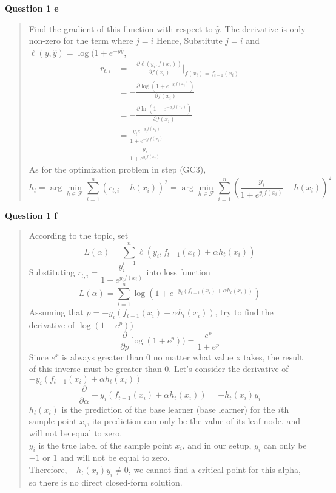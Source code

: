\documentclass[12pt,a4paper]{article}
\begin{document}
    \newpage
    \textbf{Question 1 e}
    \vspace{2mm}
    \begin{quote}
        Find the gradient of this function with respect to $\hat{y}$.
        The derivative is only non-zero for the term where $j = i$
        Hence, Substitute $j=i$ and $\ell(y,\hat{y})=\log(1+e^{-y\hat{y}}$,
        \begin{align*}
            r_{t,i} &= -\frac{\partial \ell(y_i, f(x_i))}{\partial f(x_i)}\left|\right._{f(x_i)=f_{t-1}(x_i)}\\
            &=- \frac{\partial \log(1+e^{-y_i f(x_i)})}{\partial f(x_i)}\\
            &=- \frac{\partial \ln(1+e^{-y_i f(x_i)})}{\partial f(x_i)}\\
            &=\frac{y_i e^{-y_i f(x_i)}}{1+e^{-y_i f(x_i)}}\\
            &=\frac{y_i}{1+e^{y_i f(x_i)}}
        \end{align*}
        As for the optimization problem in step (GC3),
        \[h_t = \arg\min_{h \in \mathcal{F}} \sum_{i=1}^{n} \left(r_{t,i} - h(x_i)\right)^2= \arg\min_{h \in \mathcal{F}} \sum_{i=1}^{n} \left(\frac{y_i}{1+e^{y_i f(x_i)}} - h(x_i)\right)^2\]
    \end{quote}

    \vspace{12mm}
    \textbf{Question 1 f}
    \vspace{2mm}
    \begin{quote}
        According to the topic, set
        \[L(\alpha) = \sum_{i=1}^{n} \ell\left(y_i, f_{t-1}(x_i) + \alpha h_t(x_i)\right)\]
        Substituting $r_{t,i} = \dfrac{y_i}{1+e^{y_i f(x_i)}}$ into loss function
        \[L(\alpha) = \sum_{i=1}^{n} \log\left(1 + e^{-y_i \left(f_{t-1}(x_i) + \alpha h_t(x_i)\right)}\right)\]
        Assuming that $p = -y_i \left(f_{t-1}(x_i) + \alpha h_t(x_i)\right)$, try to find the derivative of
        $\log(1+e^p))$
        \[\frac{\partial}{\partial p}\log(1+e^p))=\frac{e^p}{1+e^p}\]
        Since $e^x$ is always greater than 0 no matter what value x takes,
        the result of this inverse must be greater than 0.
        Let's consider the derivative of $-y_i \left(f_{t-1}(x_i) + \alpha h_t(x_i)\right)$
        \[\frac{\partial}{\partial \alpha}-y_i \left(f_{t-1}(x_i) + \alpha h_t(x_i)\right)=-h_t(x_i)y_i\]
        $h_t(x_i)$ is the prediction of the base learner (base learner) for the $i$th sample point $x_i$, its prediction
        can only be the value of its leaf node, and will not be equal to zero.\\
        $y_i$ is the true label of the sample point $x_i$, and in our setup,
        $y_i$ can only be $-1$ or $1$ and will not be equal to zero.\vspace{10pt}\\
        Therefore, $-h_t(x_i)y_i \neq 0$, we cannot find a critical point for this alpha,
        so there is no direct closed-form solution.
    \end{quote}
\end{document}
